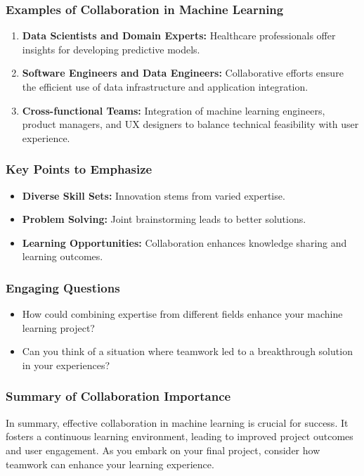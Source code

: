 \documentclass[aspectratio=169]{beamer}
\begin{document}
\begin{frame}[fragile]
    \frametitle{Examples of Collaboration in Machine Learning}
    \begin{enumerate}
        \item \textbf{Data Scientists and Domain Experts:} Healthcare professionals offer insights for developing predictive models.
        \item \textbf{Software Engineers and Data Engineers:} Collaborative efforts ensure the efficient use of data infrastructure and application integration.
        \item \textbf{Cross-functional Teams:} Integration of machine learning engineers, product managers, and UX designers to balance technical feasibility with user experience.
    \end{enumerate}
\end{frame}

\begin{frame}[fragile]
    \frametitle{Key Points to Emphasize}
    \begin{itemize}
        \item \textbf{Diverse Skill Sets:} Innovation stems from varied expertise.
        \item \textbf{Problem Solving:} Joint brainstorming leads to better solutions.
        \item \textbf{Learning Opportunities:} Collaboration enhances knowledge sharing and learning outcomes.
    \end{itemize}
\end{frame}

\begin{frame}[fragile]
    \frametitle{Engaging Questions}
    \begin{itemize}
        \item How could combining expertise from different fields enhance your machine learning project?
        \item Can you think of a situation where teamwork led to a breakthrough solution in your experiences?
    \end{itemize}
\end{frame}

\begin{frame}[fragile]
    \frametitle{Summary of Collaboration Importance}
    In summary, effective collaboration in machine learning is crucial for success. It fosters a continuous learning environment, leading to improved project outcomes and user engagement. As you embark on your final project, consider how teamwork can enhance your learning experience.
\end{frame}
\end{document}
